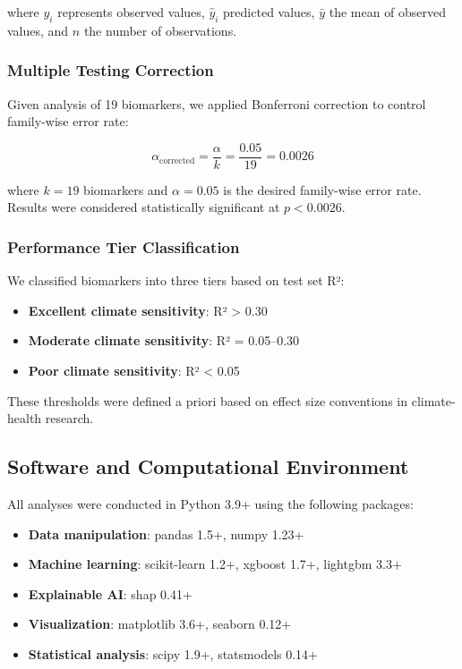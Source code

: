 where $y_i$ represents observed values, $\hat{y}_i$ predicted values, $\bar{y}$ the mean of observed values, and $n$ the number of observations.

\subsubsection{Multiple Testing Correction}

Given analysis of 19 biomarkers, we applied Bonferroni correction to control family-wise error rate:

\begin{equation}
    \alpha_{\text{corrected}} = \frac{\alpha}{k} = \frac{0.05}{19} = 0.0026
\end{equation}

where $k=19$ biomarkers and $\alpha=0.05$ is the desired family-wise error rate. Results were considered statistically significant at $p < 0.0026$.

\subsubsection{Performance Tier Classification}

We classified biomarkers into three tiers based on test set R²:

\begin{itemize}
    \item \textbf{Excellent climate sensitivity}: R² > 0.30
    \item \textbf{Moderate climate sensitivity}: R² = 0.05--0.30
    \item \textbf{Poor climate sensitivity}: R² < 0.05
\end{itemize}

These thresholds were defined a priori based on effect size conventions in climate-health research.

\subsection{Software and Computational Environment}

All analyses were conducted in Python 3.9+ using the following packages:
\begin{itemize}
    \item \textbf{Data manipulation}: pandas 1.5+, numpy 1.23+
    \item \textbf{Machine learning}: scikit-learn 1.2+, xgboost 1.7+, lightgbm 3.3+
    \item \textbf{Explainable AI}: shap 0.41+
    \item \textbf{Visualization}: matplotlib 3.6+, seaborn 0.12+
    \item \textbf{Statistical analysis}: scipy 1.9+, statsmodels 0.14+
\end{itemize}

